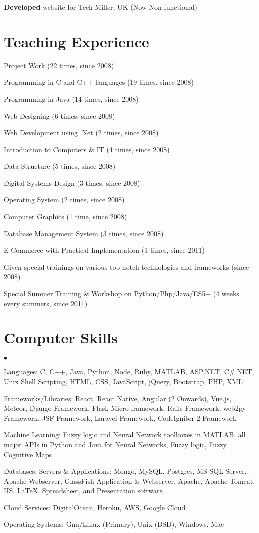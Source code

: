 \documentclass[margin,line]{res}
\newenvironment{list2}{
  \begin{list}{$\bullet$}{%
      \setlength{\itemsep}{0in}
      \setlength{\parsep}{0in} \setlength{\parskip}{0in}
      \setlength{\topsep}{0in} \setlength{\partopsep}{0in}
      \setlength{\leftmargin}{0.2in}}}{\end{list}}
\begin{document}
\begin{resume}
\textbf{Developed} website for Tech Miller, UK (Now Non-functional)

\section{\sc Teaching Experience}

Project Work (22 times, since 2008)

Programming in C and C++ languages (19 times, since 2008)

Programming in Java (14 times, since 2008)

Web Designing (6 times, since 2008)

Web Development using .Net (2 times, since 2008)

Introduction to Computers \& IT (4 times, since 2008)

Data Structure (5 times, since 2008)

Digital Systems Design (3 times, since 2008)

Operating System (2 times, since 2008)

Computer Graphics (1 time, since 2008)

Database Management System (3 times, since 2008)

E-Commerce with Practical Implementation (1 times, since 2011)

Given special trainings on various top notch technologies and frameworks (since 2008)

Special Summer Training \& Workshop on Python/Php/Java/ES5+ (4 weeks every summers, since 2011)

\section{\sc Computer Skills}
\begin{list2}
\item Languages:  C, C++, Java, Python, Node, Ruby, MATLAB, ASP.NET, C\#.NET, Unix Shell Scripting, HTML, CSS, JavaScript, jQuery, Bootstrap, PHP, XML\\
\item Frameworks/Libraries: React, React Native, Angular (2 Onwards), Vue.js, Meteor, Django Framework, Flask Micro-framework, Rails Framework, web2py Framework, JSF Framework, Laravel Framework, CodeIgnitor 2 Framework\\
\item Machine Learning: Fuzzy logic and Neural Network toolboxes in MATLAB, all major APIs in Python and Java for Neural Networks, Fuzzy logic, Fuzzy Cognitive Maps  
\item Databases, Servers \& Applications: Mongo, MySQL, Postgres, MS-SQL Server, Apache Webserver, GlassFish Application \& Webserver, Apache, Apache Tomcat, IIS, \LaTeX, Spreadsheet, and Presentation software\\
\item Cloud Services: DigitalOcean, Heroku, AWS, Google Cloud\\
\item Operating Systems:  Gnu/Linux (Primary), Unix (BSD), Windows, Mac\\
\end{list2}


\end{resume}
\end{document}
